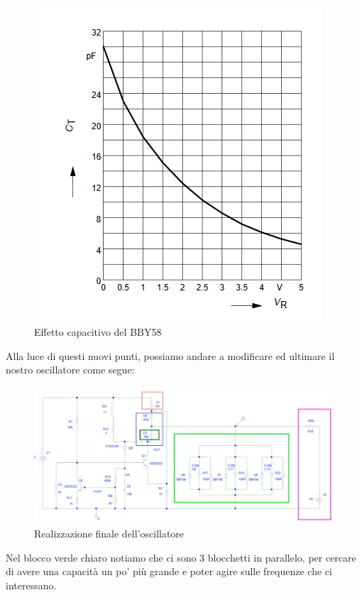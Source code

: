 \documentclass{article}
\begin{document}
~\begin{figure}[H]
\includegraphics[width=\textwidth]{BBY58.png}
\centering
\caption{Effetto capacitivo del BBY58}
\label{fig:foo}
\end{figure}
Alla luce di questi nuovi punti, possiamo andare a modificare ed ultimare il nostro oscillatore come segue:
~\begin{figure}[H]
\includegraphics[width=\textwidth]{UltimoOscillatore.png}
\centering
\caption{Realizzazione finale dell'oscillatore}
\label{fig:foo}
\end{figure}
Nel blocco verde chiaro notiamo che ci sono 3 blocchetti in parallelo, per cercare di avere una capacità un po' più grande e poter agire sulle frequenze che ci interessano.
\end{document}
